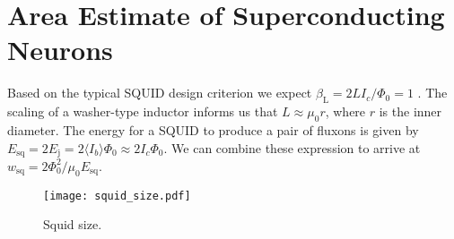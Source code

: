 \documentclass[twocolumn]{article}
\begin{document}
\section{Area Estimate of Superconducting Neurons}
Based on the typical SQUID design criterion we expect $\beta_{\mathrm{L}} = 2LI_c/\Phi_0 = 1$ \cite{clbr2006}. The scaling of a washer-type inductor informs us that $L \approx \mu_0 r$, where $r$ is the inner diameter. The energy for a SQUID to produce a pair of fluxons is given by $E_{\mathrm{sq}} = 2E_{\mathrm{j}} = 2 \langle I_b \rangle \Phi_0 \approx 2 I_c \Phi_0$. We can combine these expression to arrive at $w_{\mathrm{sq}} = 2\Phi_0^2/\mu_0 E_{\mathrm{sq}}$.

\begin{figure}[!h]
    \centering
    \texttt{[image: squid\_size.pdf]}
    \caption{Squid size.}
    \label{fig:squid_size}
\end{figure}








\end{document}
